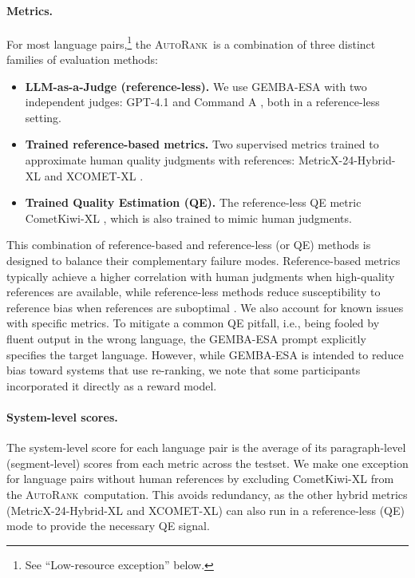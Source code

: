 \documentclass[11pt]{article}
\newcommand{\auto}{\textsc{AutoRank}}
\begin{document}
\paragraph{Metrics.}
For most language pairs,\footnote{See ``Low-resource exception'' below.} the \auto\ is a combination of three distinct families of evaluation methods:
\begin{itemize}
    \item \textbf{LLM-as-a-Judge (reference-less).} We use GEMBA-ESA \citep{kocmi-federmann-2023-large} with two independent judges: GPT-4.1 \citep{openai_gpt41_2025} and Command A \citep{cohere2025commandaenterprisereadylarge}, both in a reference-less setting.
    \item \textbf{Trained reference-based metrics.} Two supervised metrics trained to approximate human quality judgments with references: MetricX-24-Hybrid-XL \citep{juraska-etal-2024-metricx} and XCOMET-XL \citep{guerreiro-etal-2024-xcomet}.
    \item \textbf{Trained Quality Estimation (QE).} The reference-less QE metric CometKiwi-XL \citep{rei-etal-2023-scaling}, which is also trained to mimic human judgments.
\end{itemize}



This combination of reference-based and reference-less (or QE) methods is designed to balance their complementary failure modes. Reference-based metrics typically achieve a higher correlation with human judgments when high-quality references are available, while reference-less methods reduce susceptibility to reference bias when references are suboptimal \citep{freitag-etal-2023-results}. We also account for known issues with specific metrics. To mitigate a common QE pitfall, i.e., being fooled by fluent output in the wrong language, the GEMBA-ESA prompt explicitly specifies the target language. However, while GEMBA-ESA is intended to reduce bias toward systems that use re-ranking, we note that some participants incorporated it directly as a reward model.

\paragraph{System-level scores.}
The system-level score for each language pair is the average of its paragraph-level (segment-level) scores from each metric across the testset. We make one exception for language pairs without human references by excluding CometKiwi-XL from the \auto\ computation. This avoids redundancy, as the other hybrid metrics (MetricX-24-Hybrid-XL and XCOMET-XL) can also run in a reference-less (QE) mode to provide the necessary QE signal.
\end{document}
